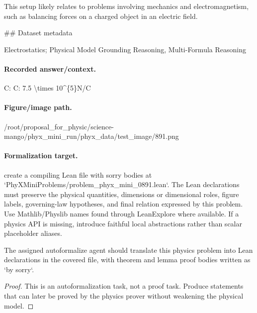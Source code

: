 This setup likely relates to problems involving mechanics and electromagnetism, such as balancing forces on a charged object in an electric field.

\#\# Dataset metadata

Electrostatics; Physical Model Grounding Reasoning, Multi-Formula Reasoning

\paragraph{Recorded answer/context.}
C: C: 7.5 \textbackslash{}times 10\textasciicircum{}\{5\}N/C

\paragraph{Figure/image path.}
/root/proposal\_for\_physic/science-mango/phyx\_mini\_run/phyx\_data/test\_image/891.png

\paragraph{Formalization target.}
create a compiling Lean file with sorry bodies at `PhyXMiniProblems/problem\_phyx\_mini\_0891.lean`. The Lean declarations must preserve the physical quantities, dimensions or dimensional roles, figure labels, governing-law hypotheses, and final relation expressed by this problem.
Use Mathlib/Physlib names found through LeanExplore where available. If a physics API is missing, introduce faithful local abstractions rather than scalar placeholder aliases.

\begin{theorem}
\label{thm:physics:phyx_mini_0891:target}
The assigned autoformalize agent should translate this physics problem into Lean declarations in the covered file, with theorem and lemma proof bodies written as `by sorry`.
\end{theorem}
\begin{proof}
This is an autoformalization task, not a proof task. Produce statements that can later be proved by the physics prover without weakening the physical model.
\end{proof}

